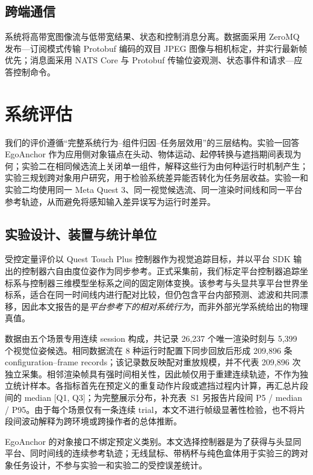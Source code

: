 \documentclass[9pt,twocolumn,letterpaper]{extarticle}
\begin{document}
\subsection{跨端通信}


系统将高带宽图像流与低带宽结果、状态和控制消息分离。数据面采用 ZeroMQ 发布---订阅模式传输 Protobuf 编码的双目 JPEG 图像与相机标定，并实行最新帧优先；消息面采用 NATS Core 与 Protobuf 传输位姿观测、状态事件和请求---应答控制命令。

\section{系统评估}\label{sec:eval}

我们的评价遵循“完整系统行为--组件归因--任务层效用”的三层结构。实验一回答 EgoAnchor 作为应用侧对象锚点在头动、物体运动、起停转换与遮挡期间表现为何；实验二在相同候选流上关闭单一组件，解释这些行为由何种运行时机制产生；实验三规划跨对象用户研究，用于检验系统差异能否转化为任务层收益。实验一和实验二均使用同一 Meta Quest 3、同一视觉候选流、同一渲染时间线和同一平台参考轨迹，从而避免将感知输入差异误写为运行时差异。

\subsection{实验设计、装置与统计单位}

受控定量评价以 Quest Touch Plus 控制器作为视觉追踪目标，并以平台 SDK 输出的控制器六自由度位姿作为同步参考。正式采集前，我们标定平台控制器追踪坐标系与控制器三维模型坐标系之间的固定刚体变换。该参考与头显共享平台世界坐标系，适合在同一时间线内进行配对比较，但仍包含平台内部预测、滤波和共同漂移，因此本文报告的是\emph{平台参考下的相对系统行为}，而非外部光学系统给出的物理真值。

数据由五个场景专用连续 session 构成，共记录 26,237 个唯一渲染时刻与 5,399 个视觉位姿候选。相同数据流在 8 种运行时配置下同步回放后形成 209,896 条 configuration--frame records；该记录数反映配对重放规模，并不代表 209,896 次独立采集。相邻渲染帧具有强时间相关性，因此帧仅用于重建连续轨迹，不作为独立统计样本。各指标首先在预定义的重复动作片段或遮挡过程内计算，再汇总片段间的 median [Q1, Q3]；为完整展示分布，补充表~S1 另报告片段间 P5 / median / P95。由于每个场景仅有一条连续 trial，本文不进行帧级显著性检验，也不将片段间波动解释为跨环境或跨操作者的总体推断。

EgoAnchor 的对象接口不绑定预定义类别。本文选择控制器是为了获得与头显同平台、同时间线的连续参考轨迹；无线鼠标、带柄杯与纯色盒体用于实验三的跨对象任务设计，不参与实验一和实验二的受控误差统计。
\end{document}
